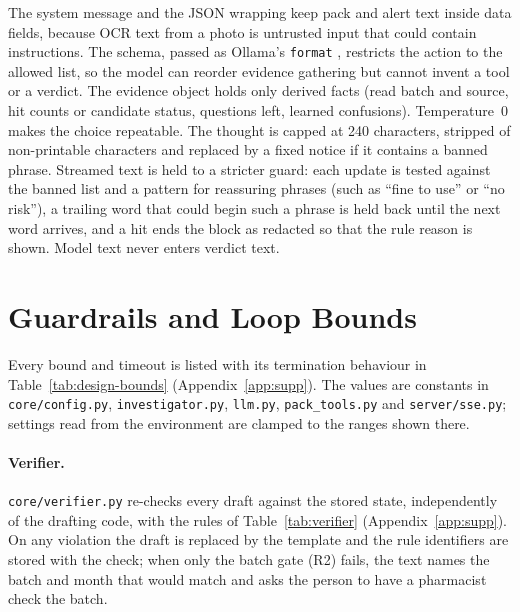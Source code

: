 The system message and the JSON wrapping keep pack and alert text inside data fields, because OCR text from a photo is untrusted input that could contain instructions. The schema, passed as Ollama's \texttt{format} \cite{ollama2026structured}, restricts the action to the allowed list, so the model can reorder evidence gathering but cannot invent a tool or a verdict. The evidence object holds only derived facts (read batch and source, hit counts or candidate status, questions left, learned confusions). Temperature~0 makes the choice repeatable. The thought is capped at 240 characters, stripped of non-printable characters and replaced by a fixed notice if it contains a banned phrase. Streamed text is held to a stricter guard: each update is tested against the banned list and a pattern for reassuring phrases (such as ``fine to use'' or ``no risk''), a trailing word that could begin such a phrase is held back until the next word arrives, and a hit ends the block as redacted so that the rule reason is shown. Model text never enters verdict text.

\section{Guardrails and Loop Bounds}
\label{sec:impl-guardrails-and-loop-bounds}

Every bound and timeout is listed with its termination behaviour in Table~\ref{tab:design-bounds} (Appendix~\ref{app:supp}). The values are constants in \texttt{core/config.py}, \texttt{investigator.py}, \texttt{llm.py}, \texttt{pack\_tools.py} and \texttt{server/sse.py}; settings read from the environment are clamped to the ranges shown there.


\paragraph{Verifier.} \texttt{core/verifier.py} re-checks every draft against the stored state, independently of the drafting code, with the rules of Table~\ref{tab:verifier} (Appendix~\ref{app:supp}). On any violation the draft is replaced by the \CANTV{} template and the rule identifiers are stored with the check; when only the batch gate (R2) fails, the text names the batch and month that would match and asks the person to have a pharmacist check the batch.

